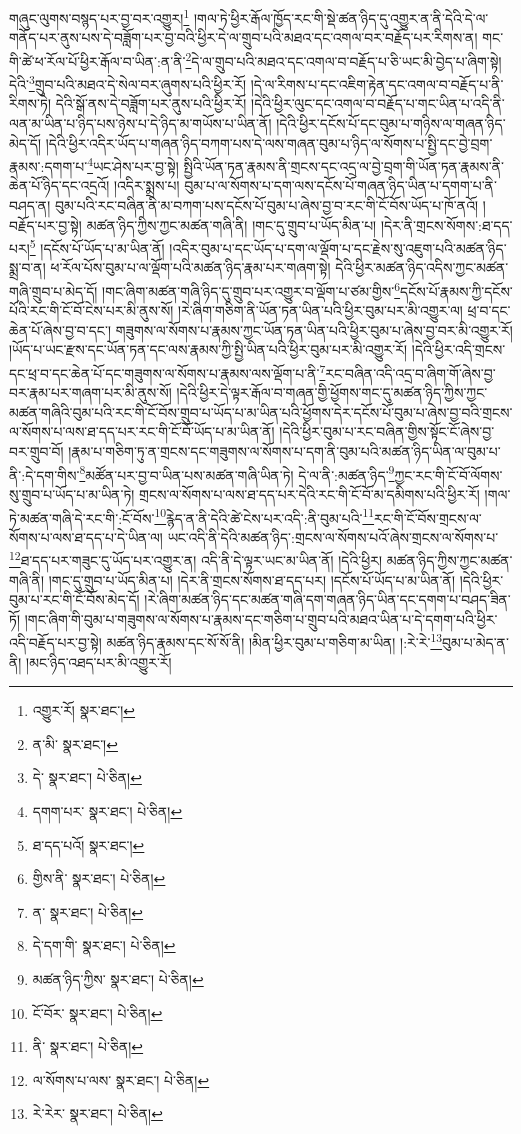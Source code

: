 གཞུང་ལུགས་བསྙད་པར་བྱ་བར་འགྱུར།\footnote{འགྱུར་རོ།  སྣར་ཐང་། } །གལ་ཏེ་ཕྱིར་རྒོལ་ཁྱོད་རང་གི་སྡེ་ཚན་ཉིད་དུ་འགྱུར་ན་ནི་དེའི་དེ་ལ་གནོད་པར་ནུས་པས་དེ་བཟློག་པར་བྱ་བའི་ཕྱིར་དེ་ལ་གྲུབ་པའི་མཐའ་དང་འགལ་བར་བརྗོད་པར་རིགས་ན། གང་གི་ཚེ་ཕ་རོལ་པོ་ཕྱིར་རྒོལ་བ་ཡིན་:ན་ནི་\footnote{ན་མི་  སྣར་ཐང་། }དེ་ལ་གྲུབ་པའི་མཐའ་དང་འགལ་བ་བརྗོད་པ་ཅི་ཡང་མི་བྱེད་པ་ཞིག་སྟེ། དེའི་\footnote{དེ་  སྣར་ཐང་།  པེ་ཅིན། }གྲུབ་པའི་མཐའ་དེ་སེལ་བར་ཞུགས་པའི་ཕྱིར་རོ། །དེ་ལ་རིགས་པ་དང་འཇིག་རྟེན་དང་འགལ་བ་བརྗོད་པ་ནི་རིགས་ཏེ། དེའི་སྒོ་ནས་དེ་བཟློག་པར་ནུས་པའི་ཕྱིར་རོ། །དེའི་ཕྱིར་ལུང་དང་འགལ་བ་བརྗོད་པ་གང་ཡིན་པ་འདི་ནི་ལན་མ་ཡིན་པ་ཉིད་པས་ཉེས་པ་དེ་ཉིད་མ་གཡོས་པ་ཡིན་ནོ། །དེའི་ཕྱིར་དངོས་པོ་དང་བུམ་པ་གཉིས་ལ་གཞན་ཉིད་མེད་དོ། །དེའི་ཕྱིར་འདིར་ཡོད་པ་གཞན་ཉིད་བཀག་པས་དེ་ལས་གཞན་བུམ་པ་ཉིད་ལ་སོགས་པ་སྤྱི་དང་བྱེ་བྲག་རྣམས་:དགག་པ་\footnote{དགག་པར་  སྣར་ཐང་།  པེ་ཅིན། }ཡང་ཤེས་པར་བྱ་སྟེ། སྤྱིའི་ཡོན་ཏན་རྣམས་ནི་གྲངས་དང་འདྲ་ལ་བྱེ་བྲག་གི་ཡོན་ཏན་རྣམས་ནི་ཆེན་པོ་ཉིད་དང་འདྲའོ། །འདིར་སྨྲས་པ། བུམ་པ་ལ་སོགས་པ་དག་ལས་དངོས་པོ་གཞན་ཉིད་ཡིན་པ་དགག་པ་ནི་བཤད་ན། བུམ་པའི་རང་བཞིན་ནི་མ་བཀག་པས་དངོས་པོ་བུམ་པ་ཞེས་བྱ་བ་རང་གི་ངོ་བོས་ཡོད་པ་ཁོ་ནའོ། །བརྗོད་པར་བྱ་སྟེ། མཚན་ཉིད་ཀྱིས་ཀྱང་མཚན་གཞི་ནི། །གང་དུ་གྲུབ་པ་ཡོད་མིན་པ། །དེར་ནི་གྲངས་སོགས་:ཐ་དད་པར།\footnote{ཐ་དད་པའོ།  སྣར་ཐང་། } །དངོས་པོ་ཡོད་པ་མ་ཡིན་ནོ། །འདིར་བུམ་པ་དང་ཡོད་པ་དག་ལ་ལྡོག་པ་དང་རྗེས་སུ་འཇུག་པའི་མཚན་ཉིད་སྨྲ་བ་ན། ཕ་རོལ་པོས་བུམ་པ་ལ་ལྡོག་པའི་མཚན་ཉིད་རྣམ་པར་གཞག་སྟེ། དེའི་ཕྱིར་མཚན་ཉིད་འདིས་ཀྱང་མཚན་གཞི་གྲུབ་པ་མེད་དོ། །གང་ཞིག་མཚན་གཞི་ཉིད་དུ་གྲུབ་པར་འགྱུར་བ་ལྡོག་པ་ཙམ་གྱིས་\footnote{གྱིས་ནི་  སྣར་ཐང་།  པེ་ཅིན། }དངོས་པོ་རྣམས་ཀྱི་དངོས་པོའི་རང་གི་ངོ་བོ་ངེས་པར་མི་ནུས་སོ། །རེ་ཞིག་གཅིག་ནི་ཡོན་ཏན་ཡིན་པའི་ཕྱིར་བུམ་པར་མི་འགྱུར་ལ། ཕྲ་བ་དང་ཆེན་པོ་ཞེས་བྱ་བ་དང་། གཟུགས་ལ་སོགས་པ་རྣམས་ཀྱང་ཡོན་ཏན་ཡིན་པའི་ཕྱིར་བུམ་པ་ཞེས་བྱ་བར་མི་འགྱུར་རོ། །ཡོད་པ་ཡང་རྫས་དང་ཡོན་ཏན་དང་ལས་རྣམས་ཀྱི་སྤྱི་ཡིན་པའི་ཕྱིར་བུམ་པར་མི་འགྱུར་རོ། །དེའི་ཕྱིར་འདི་གྲངས་དང་ཕྲ་བ་དང་ཆེན་པོ་དང་གཟུགས་ལ་སོགས་པ་རྣམས་ལས་ལྡོག་པ་ནི་\footnote{ན་  སྣར་ཐང་།  པེ་ཅིན། }རང་བཞིན་འདི་འདྲ་བ་ཞིག་གོ་ཞེས་བྱ་བར་རྣམ་པར་གཞག་པར་མི་ནུས་སོ། །དེའི་ཕྱིར་དེ་ལྟར་རྒོལ་བ་གཞན་གྱི་ཕྱོགས་གང་དུ་མཚན་ཉིད་ཀྱིས་ཀྱང་མཚན་གཞིའི་བུམ་པའི་རང་གི་ངོ་བོས་གྲུབ་པ་ཡོད་པ་མ་ཡིན་པའི་ཕྱོགས་དེར་དངོས་པོ་བུམ་པ་ཞེས་བྱ་བའི་གྲངས་ལ་སོགས་པ་ལས་ཐ་དད་པར་རང་གི་ངོ་བོ་ཡོད་པ་མ་ཡིན་ནོ། །དེའི་ཕྱིར་བུམ་པ་རང་བཞིན་གྱིས་སྟོང་ངོ་ཞེས་བྱ་བར་གྲུབ་བོ། །རྣམ་པ་གཅིག་ཏུ་ན་གྲངས་དང་གཟུགས་ལ་སོགས་པ་དག་ནི་བུམ་པའི་མཚན་ཉིད་ཡིན་ལ་བུམ་པ་ནི་:དེ་དག་གིས་\footnote{དེ་དག་གི་  སྣར་ཐང་།  པེ་ཅིན། }མཚོན་པར་བྱ་བ་ཡིན་པས་མཚན་གཞི་ཡིན་ཏེ། དེ་ལ་ནི་:མཚན་ཉིད་\footnote{མཚན་ཉིད་ཀྱིས་  སྣར་ཐང་།  པེ་ཅིན། }ཀྱང་རང་གི་ངོ་བོ་ལོགས་སུ་གྲུབ་པ་ཡོད་པ་མ་ཡིན་ཏེ། གྲངས་ལ་སོགས་པ་ལས་ཐ་དད་པར་དེའི་རང་གི་ངོ་བོ་མ་དམིགས་པའི་ཕྱིར་རོ། །གལ་ཏེ་མཚན་གཞི་དེ་རང་གི་:ངོ་བོས་\footnote{ངོ་བོར་  སྣར་ཐང་།  པེ་ཅིན། }རྙེད་ན་ནི་དེའི་ཚེ་ངེས་པར་འདི་:ནི་བུམ་པའི་\footnote{ནི་  སྣར་ཐང་།  པེ་ཅིན། }རང་གི་ངོ་བོས་གྲངས་ལ་སོགས་པ་ལས་ཐ་དད་པ་དེ་ཡིན་ལ། ཡང་འདི་ནི་དེའི་མཚན་ཉིད་:གྲངས་ལ་སོགས་པའོ་ཞེས་གྲངས་ལ་སོགས་པ་\footnote{ལ་སོགས་པ་ལས་  སྣར་ཐང་།  པེ་ཅིན། }ཐ་དད་པར་གཟུང་དུ་ཡོད་པར་འགྱུར་ན། འདི་ནི་དེ་ལྟར་ཡང་མ་ཡིན་ནོ། །དེའི་ཕྱིར། མཚན་ཉིད་ཀྱིས་ཀྱང་མཚན་གཞི་ནི། །གང་དུ་གྲུབ་པ་ཡོད་མིན་པ། །དེར་ནི་གྲངས་སོགས་ཐ་དད་པར། །དངོས་པོ་ཡོད་པ་མ་ཡིན་ནོ། །དེའི་ཕྱིར་བུམ་པ་རང་གི་ངོ་བོས་མེད་དོ། །རེ་ཞིག་མཚན་ཉིད་དང་མཚན་གཞི་དག་གཞན་ཉིད་ཡིན་དང་དགག་པ་བཤད་ཟིན་ཏོ། །གང་ཞིག་གི་བུམ་པ་གཟུགས་ལ་སོགས་པ་རྣམས་དང་གཅིག་པ་གྲུབ་པའི་མཐའ་ཡིན་པ་དེ་དགག་པའི་ཕྱིར་འདི་བརྗོད་པར་བྱ་སྟེ། མཚན་ཉིད་རྣམས་དང་སོ་སོ་ནི། །མིན་ཕྱིར་བུམ་པ་གཅིག་མ་ཡིན། །:རེ་རེ་\footnote{རེ་རེར་  སྣར་ཐང་།  པེ་ཅིན། }བུམ་པ་མེད་ན་ནི། །མང་ཉིད་འཐད་པར་མི་འགྱུར་རོ། 